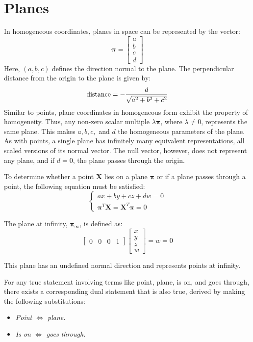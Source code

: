 \section{Planes}

In homogeneous coordinates, planes in space can be represented by the vector:
\[\boldsymbol{\pi}=\begin{bmatrix} a \\ b \\c \\d \end{bmatrix}\]
Here, $(a, b, c)$ defines the direction normal to the plane. 
The perpendicular distance from the origin to the plane is given by:
\[\textnormal{distance}=-\dfrac{d}{\sqrt{a^2+b^2+c^2}}\]
Similar to points, plane coordinates in homogeneous form exhibit the property of homogeneity.
Thus, any non-zero scalar multiple $\lambda \boldsymbol{\pi}$, where $\lambda \neq 0$, represents the same plane.
This makes $a, b, c,$ and $d$ the homogeneous parameters of the plane.
As with points, a single plane has infinitely many equivalent representations, all scaled versions of its normal vector. 
The null vector, however, does not represent any plane, and if $d=0$, the plane passes through the origin.

To determine whether a point $\mathbf{X}$ lies on a plane $\boldsymbol{\pi}$ or if a plane passes through a point, the following equation must be satisfied:
\[\begin{cases} ax+by+cz+dw=0 \\ \boldsymbol{\pi}^T\mathbf{X}=\mathbf{X}^T\boldsymbol{\pi}=0 \end{cases}\]
\begin{definition}
    The plane at infinity, $\boldsymbol{\pi}_{\infty}$, is defined as:
    \[\begin{bmatrix} 0 & 0 & 0 & 1 \end{bmatrix} \begin{bmatrix} x \\ y \\ z \\ w \end{bmatrix}=w=0\] 
\end{definition}
This plane has an undefined normal direction and represents points at infinity.
\begin{theorem}
    For any true statement involving terms like point, plane, is on, and goes through, there exists a corresponding dual statement that is also true, derived by making the following substitutions:
\end{theorem}
\begin{itemize}
    \item \textit{Point $\Leftrightarrow$ plane.}
    \item \textit{Is on $\Leftrightarrow$ goes through.}
\end{itemize}


